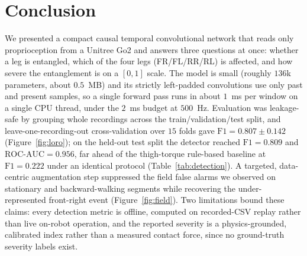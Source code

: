 \section{Conclusion}
We presented a compact causal temporal convolutional network that reads only proprioception from a Unitree Go2 and answers three questions at once: whether a leg is entangled, which of the four legs (FR/FL/RR/RL) is affected, and how severe the entanglement is on a $[0,1]$ scale. The model is small (roughly $136$k parameters, about $0.5$~MB) and its strictly left-padded convolutions use only past and present samples, so a single forward pass runs in about $1$~ms per window on a single CPU thread, under the $2$~ms budget at $500$~Hz. Evaluation was leakage-safe by grouping whole recordings across the train/validation/test split, and leave-one-recording-out cross-validation over $15$ folds gave $\mathrm{F1}=0.807\pm0.142$ (Figure~\ref{fig:loro}); on the held-out test split the detector reached $\mathrm{F1}=0.809$ and $\mathrm{ROC\text{-}AUC}=0.956$, far ahead of the thigh-torque rule-based baseline at $\mathrm{F1}=0.222$ under an identical protocol (Table~\ref{tab:detection}). A targeted, data-centric augmentation step suppressed the field false alarms we observed on stationary and backward-walking segments while recovering the under-represented front-right event (Figure~\ref{fig:field}). Two limitations bound these claims: every detection metric is offline, computed on recorded-CSV replay rather than live on-robot operation, and the reported severity is a physics-grounded, calibrated index rather than a measured contact force, since no ground-truth severity labels exist.